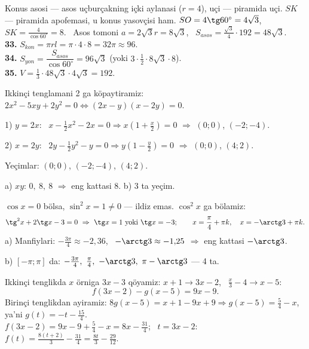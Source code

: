 \newpage
{}
Konus asosi — asos uçburçakning içki aylanasi ($r=4$), uçi — piramida uçi. $SK$ — piramida apofemasi, u konus yasovçisi ham.
$SO=4\tg60^\circ=4\sqrt3$, \ $SK=\frac4{\cos60^\circ}=8$. \ Asos tomoni $a=2\sqrt3r=8\sqrt3$, \ $S_{asos}=\frac{\sqrt3}4\cdot192=48\sqrt3$.\\
\textbf{33.} $S_{kon}=\pi rl=\pi\cdot4\cdot8=32\pi\approx96$.\\
\textbf{34.} $S_{yon}=\dfrac{S_{asos}}{\cos60^\circ}=96\sqrt3$ (yoki $3\cdot\frac12\cdot8\sqrt3\cdot8$).\\
\textbf{35.} $V=\frac13\cdot48\sqrt3\cdot4\sqrt3=192$.

\newpage
{}
Ikkinçi tenglamani 2 ga köpaytiramiz: $2x^2-5xy+2y^2=0\iff(2x-y)(x-2y)=0$.

1) $y=2x$: \ $x-\frac12x^2-2x=0\Rightarrow x\left(1+\frac x2\right)=0$ $\Rightarrow$ $(0;0)$, $(-2;-4)$.

2) $x=2y$: \ $2y-\frac12y^2-y=0\Rightarrow y\left(1-\frac y2\right)=0$ $\Rightarrow$ $(0;0)$, $(4;2)$.

Yeçimlar: $(0;0)$, $(-2;-4)$, $(4;2)$.

a) $xy$: $0,\ 8,\ 8$ $\Rightarrow$ eng kattasi 8. \qquad b) 3 ta yeçim.

\newpage
{}
$\cos x=0$ bölsa, $\sin^2x=1\ne0$ — ildiz emas. $\cos^2x$ ga bölamiz:
\[\tg^2x+2\tg x-3=0\ \Rightarrow\ \tg x=1\ \text{yoki}\ \tg x=-3;\qquad x=\frac\pi4+\pi k,\quad x=-\arctg3+\pi k.\]
a) Manfiylari: $-\frac{3\pi}4\approx-2{,}36$, \ $-\arctg3\approx-1{,}25$ $\Rightarrow$ eng kattasi $-\arctg3$.

b) $[-\pi;\pi]$ da: $-\frac{3\pi}4,\ \frac\pi4,\ -\arctg3,\ \pi-\arctg3$ — 4 ta.

\newpage
{}
Ikkinçi tenglikda $x$ örniga $3x-3$ qöyamiz: $x+1\to3x-2$, \ $\frac x3-4\to x-5$:
\[f(3x-2)-g(x-5)=9x-9.\]
Birinçi tenglikdan ayiramiz: $8g(x-5)=x+1-9x+9\Rightarrow g(x-5)=\frac54-x$, ya'ni $g(t)=-t-\frac{15}4$.\\
$f(3x-2)=9x-9+\frac54-x=8x-\frac{31}4$; \ $t=3x-2$: \ $f(t)=\frac{8(t+2)}3-\frac{31}4=\frac{8t}3-\frac{29}{12}$.

